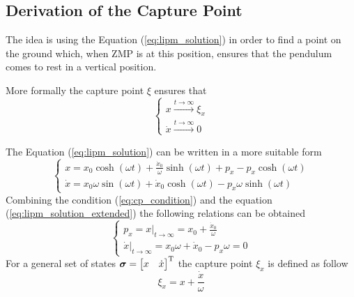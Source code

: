 \subsection{Derivation of the Capture Point}
The idea is using the Equation (\ref{eq:lipm_solution}) in order to find a point on the ground which, when ZMP is at this position, ensures that the pendulum comes to rest in a vertical position.
\par
More formally the capture point $\xi$ ensures that
\begin{equation}
  \label{eq:cp_condition}
  \begin{cases}
    x \xrightarrow{t\rightarrow \infty} \xi_x\\
    \dot{x} \xrightarrow{t\rightarrow \infty} 0
  \end{cases}
\end{equation}
\par
The Equation (\ref{eq:lipm_solution}) can be written in a more suitable form
\begin{equation}
  \label{eq:lipm_solution_extended}
  \begin{cases}
    x = x_0 \cosh(\omega t) + \frac{\dot{x}_0}{\omega} \sinh(\omega t) + p_x - p_x \cosh(\omega t)\\
    \dot{x} = x_0 \omega \sin(\omega t) + \dot{x}_0 \cosh(\omega t)  - p_x \omega \sinh(\omega t)
  \end{cases}
\end{equation}
Combining the condition (\ref{eq:cp_condition}) and the equation (\ref{eq:lipm_solution_extended})
the following relations can be obtained
\[
\begin{cases}
  p_x = x \big|_{t \rightarrow \infty} = x_0 + \frac{\dot{x}_0}{\omega}\\
  \dot{x} \big|_{t \rightarrow \infty} = x_0 \omega + \dot{x}_0 - p_x \omega = 0
\end{cases}
\]
For a general set of states $\boldsymbol{\sigma} = \begin{bmatrix} x & \dot{x} \end{bmatrix} ^{\mathrm{T}}$
the capture point $\xi_x$ is defined as follow
\begin{equation}
  \label{eq:cp_def}
  \xi_x = x + \frac{\dot{x}}{\omega}
\end{equation}

